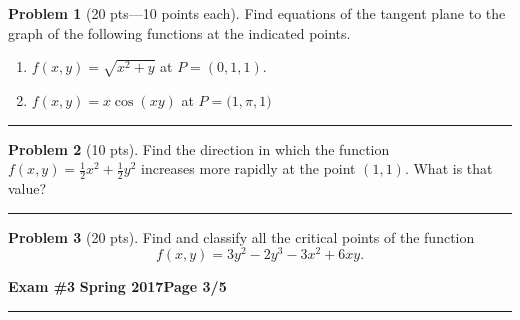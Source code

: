 \documentclass[12pt]{article}
\theoremstyle{definition}
\newtheorem{problem}{Problem}
\begin{document}
\bigskip
\begin{problem}[20 pts---10 points each] Find equations of the tangent plane to the graph of the following functions at the indicated points.
\begin{enumerate}
  \item $f(x,y) = \sqrt{x^2+y}$ at $P=(0,1,1)$.
  \vspace{1cm}
  \begin{flushright}
  \end{flushright}
  \item $f(x,y) = x\cos(xy)$ at $P=\big(1,\pi,1 \big)$
  \vspace{1cm}
  \begin{flushright}
  \end{flushright}
\end{enumerate}
\end{problem}
\hrule

\begin{problem}[10 pts]
Find the direction in which the function $f(x,y)= \tfrac{1}{2} x^2 + \tfrac{1}{2} y^2$ increases more rapidly at the point $(1,1)$.  What is that value?

\vspace{2cm}
\begin{flushright}
  \end{flushright}
\end{problem}
\hrule

\begin{problem}[20 pts]
Find and classify all the critical points of the function 
\begin{equation*}
f(x,y) = 3y^2 - 2y^3-3x^2+6xy.
\end{equation*}
\end{problem}

\newpage

\hfill{\large\bf Exam \#3}\hfill{\large\bf
  Spring 2017}\hfill{\large\bf Page 3/5}\hrule
\end{document}
